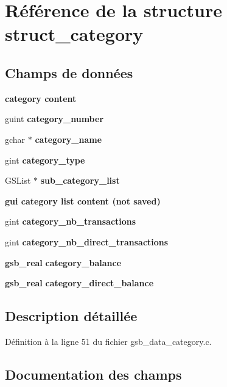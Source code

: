 \section{Référence de la structure struct\_\-category}
\label{structstruct__category}
\subsection*{Champs de données}
\begin{Indent}{\bf category content}\par
{\em \label{_amgrp0bee37d1193a33082093760e1563dd01}
 }\begin{DoxyCompactItemize}
\item 
guint {\bf category\_\-number}
\item 
gchar $\ast$ {\bf category\_\-name}
\item 
gint {\bf category\_\-type}
\item 
GSList $\ast$ {\bf sub\_\-category\_\-list}
\end{DoxyCompactItemize}
\end{Indent}
\begin{Indent}{\bf gui category list content (not saved)}\par
{\em \label{_amgrpc2ae330bd34a5dcaf174f20bf06b1ed5}
 }\begin{DoxyCompactItemize}
\item 
gint {\bf category\_\-nb\_\-transactions}
\item 
gint {\bf category\_\-nb\_\-direct\_\-transactions}
\item 
{\bf gsb\_\-real} {\bf category\_\-balance}
\item 
{\bf gsb\_\-real} {\bf category\_\-direct\_\-balance}
\end{DoxyCompactItemize}
\end{Indent}


\subsection{Description détaillée}


Définition à la ligne 51 du fichier gsb\_\-data\_\-category.c.



\subsection{Documentation des champs}
